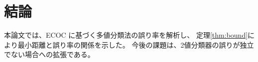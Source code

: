 \chapter{結論}\label{chap:conclusion}

本論文では、ECOC に基づく多値分類法の誤り率を解析し、
定理\ref{thm:bound}により最小距離と誤り率の関係を示した。
今後の課題は、2値分類器の誤りが独立でない場合への拡張である。
